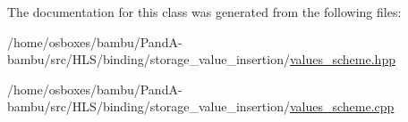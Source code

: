 The documentation for this class was generated from the following files\+:\begin{DoxyCompactItemize}
\item 
/home/osboxes/bambu/\+Pand\+A-\/bambu/src/\+H\+L\+S/binding/storage\+\_\+value\+\_\+insertion/\hyperlink{values__scheme_8hpp}{values\+\_\+scheme.\+hpp}\item 
/home/osboxes/bambu/\+Pand\+A-\/bambu/src/\+H\+L\+S/binding/storage\+\_\+value\+\_\+insertion/\hyperlink{values__scheme_8cpp}{values\+\_\+scheme.\+cpp}\end{DoxyCompactItemize}
